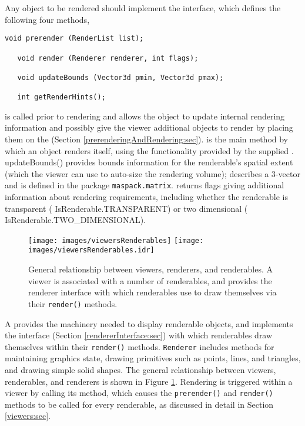 Any object to be rendered should implement the
 interface, which defines the
following four methods,
%
\begin{lstlisting}[]
   void prerender (RenderList list);

   void render (Renderer renderer, int flags);

   void updateBounds (Vector3d pmin, Vector3d pmax);

   int getRenderHints();
\end{lstlisting}
%
is called prior to rendering and allows the object to update internal
rendering information and possibly give the viewer additional objects
to render by placing them on the
 (Section
\ref{prerenderingAndRendering:sec}).
 is the
main method by which an object renders itself, using the functionality
provided by the supplied .
%
{updateBounds()} provides bounds information for the renderable's
spatial extent (which the viewer can use to auto-size the rendering
volume);  describes a 3-vector and
is defined in the package {\tt maspack.matrix}.
 returns
flags giving additional information about rendering requirements,
including whether the renderable is transparent
(%
{IsRenderable.TRANSPARENT}) or two dimensional
(%
{IsRenderable.TWO\_DIMENSIONAL}).
%
\begin{figure}[t]
\begin{center}
\iflatexml
 \texttt{[image: images/viewersRenderables]}
\else
 \texttt{[image: images/viewersRenderables.idr]}
\fi
\end{center}
\caption{General relationship between viewers, renderers, and
renderables. A viewer is associated with a number of renderables, and
provides the renderer interface with which renderables use to draw
themselves via their {\tt render()} methods.}
\label{viewersRenderables:fig}
\end{figure}
%

A  provides the machinery needed to
display renderable objects, and implements the
 interface (Section
\ref{rendererInterface:sec}) with which renderables draw themselves
within their {\tt render()} methods.  {\tt Renderer} includes
methods for maintaining graphics state, drawing primitives such as
points, lines, and triangles, and drawing simple solid shapes.  The
general relationship between viewers, renderables, and renderers is
shown in Figure \ref{viewersRenderables:fig}.  Rendering is triggered
within a viewer by calling its
 method, which causes
the {\tt prerender()} and {\tt render()} methods to be called for
every renderable, as discussed in detail in Section \ref{viewers:sec}.

